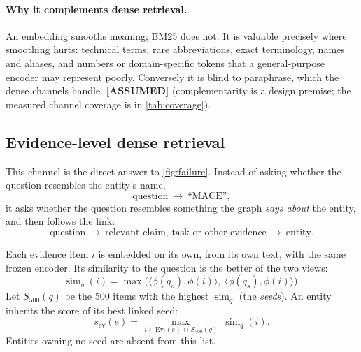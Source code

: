 \documentclass[11pt,a4paper]{article}
\newcommand{\cref}[1]{\autoref{#1}}
\theoremstyle{remark}
\DeclareMathOperator{\simop}{sim}
\newcommand{\Ev}{\mathrm{Ev}}
\newcommand{\vtag}[2]{{\sffamily\scriptsize\bfseries\textcolor{#1}{[#2]}}}
\newcommand{\Atag}{\vtag{warnline}{ASSUMED}}
\begin{document}
\paragraph{Why it complements dense retrieval.} An embedding smooths meaning; BM25 does
not. It is valuable precisely where smoothing hurts: technical terms, rare abbreviations,
exact terminology, names and aliases, and numbers or domain-specific tokens that a
general-purpose encoder may represent poorly. Conversely it is blind to paraphrase, which
the dense channels handle. \Atag{} (complementarity is a design premise; the measured
channel coverage is in \cref{tab:coverage}).

\subsection{Evidence-level dense retrieval}
\label{sec:evidence-channel}

This channel is the direct answer to \cref{fig:failure}. Instead of asking whether the
question resembles the entity's name,
\[
  \text{question}\ \longrightarrow\ \text{``MACE''},
\]
it asks whether the question resembles something the graph \emph{says about} the entity,
and then follows the link:
\[
  \text{question}\ \longrightarrow\ \text{relevant claim, task or other evidence}\ \longrightarrow\ \text{entity}.
\]

Each evidence item $i$ is embedded on its own, from its own text, with the same frozen
encoder. Its similarity to the question is the better of the two views:
\begin{equation}
  \simop_q(i)=\max\bigl(\langle\phi(q_o),\phi(i)\rangle,\ \langle\phi(q_s),\phi(i)\rangle\bigr).
\label{eq:evsim}
\end{equation}
Let $S_{500}(q)$ be the 500 items with the highest $\simop_q$ (the \emph{seeds}). An
entity inherits the score of its best linked seed:
\begin{equation}
  s_{\mathrm{ev}}(e)=\max_{\,i\in\Ev_t(e)\,\cap\,S_{500}(q)}\ \simop_q(i).
\label{eq:evidence}
\end{equation}
Entities owning no seed are absent from this list.
\end{document}

